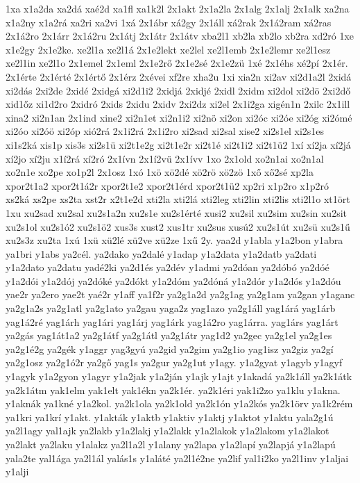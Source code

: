 {1xa
x1a2da
xa2dá
xaé2d
xa1fl
xa1k2l
2x1akt
2x1a2la
2x1alg
2x1alj
2x1alk
xa2na
x1a2ny
x1a2rá
xa2ri
xa2vi
1xá
2x1ábr
xá2gy
2x1áll
xá2rak
2x1á2ram
xá2ras
2x1á2ro
2x1árr
2x1á2ru
2x1átj
2x1átr
2x1átv
xba2l1
xb2la
xb2lo
xb2ra
xd2ró
1xe
x1e2gy
2x1e2ke.
xe2l1a
xe2l1á
2x1e2lekt
xe2lel
xe2l1emb
2x1e2lemr
xe2l1esz
xe2l1in
xe2l1o
2x1emel
2x1eml
2x1e2rő
2x1e2sé
2x1e2zü
1xé
2x1éhs
xé2pí
2x1ér.
2x1érte
2x1érté
2x1értő
2x1érz
2xévei
xf2re
xha2u
1xi
xia2n
xi2av
xi2d1a2l
2xidá
xi2dás
2xi2de
2xidé
2xidgá
xi2d1i2
2xidjá
2xidjé
2xidl
2xidm
xi2dol
xi2dö
2xi2dő
xid1őz
xi1d2ro
2xidró
2xids
2xidu
2xidv
2xi2dz
xi2el
2x1i2ga
xigén1n
2xilc
2x1ill
xina2
xi2n1an
2x1ind
xine2
xi2n1et
xi2n1i2
xi2nö
xi2on
xi2óc
xi2óe
xi2óg
xi2ómé
xi2óo
xi2óö
xi2óp
xió2rá
2x1i2rá
2x1i2ro
xi2sad
xi2sal
xise2
xi2s1el
xi2s1es
xi1s2ká
xis1p
xis3s
xi2s1ü
xi2t1e2g
xi2t1e2r
xi2t1é
xi2t1i2
xi2t1ü2
1xí
xí2ja
xí2já
xí2jo
xí2ju
x1í2rá
xí2ró
2x1ívn
2x1í2vü
2x1ívv
1xo
2x1old
xo2n1ai
xo2n1al
xo2n1e
xo2pe
xo1p2l
2x1osz
1xó
1xö
xö2dé
xö2rö
xö2zö
1xő
xő2sé
xp2la
xpor2t1a2
xpor2t1á2r
xpor2t1e2
xpor2t1érd
xpor2t1ü2
xp2ri
x1p2ro
x1p2ró
xs2ká
xs2pe
xs2ta
xst2r
x2t1e2d
xti2la
xti2lá
xti2leg
xti2lin
xti2lis
xti2l1o
xt1ört
1xu
xu2sad
xu2sal
xu2s1a2n
xu2s1e
xu2s1érté
xusi2
xu2sil
xu2sim
xu2sin
xu2sit
xu2s1ol
xu2s1ó2
xu2s1ö2
xus3s
xust2
xus1tr
xu2sus
xusú2
xu2s1út
xu2sü
xu2s1ű
xu2s3z
xu2ta
1xú
1xü
xü2lé
xü2ve
xü2ze
1xű
2y.
yaa2d
y1abla
y1a2bon
y1abra
ya1bri
y1abs
ya2cél.
ya2dako
ya2dalé
y1adap
y1a2data
y1a2datb
ya2dati
y1a2dato
ya2datu
yadé2ki
ya2d1és
ya2dév
y1admi
ya2dóan
ya2dóbó
ya2dóé
y1a2dói
y1a2dój
ya2dóké
ya2dókt
y1a2dóm
ya2dóná
y1a2dór
y1a2dós
y1a2dóu
yae2r
ya2ero
yae2t
yaé2r
y1aff
ya1f2r
ya2g1a2d
ya2g1ag
ya2g1am
ya2gan
y1aganc
ya2g1a2s
ya2g1atl
ya2g1ato
ya2gau
yaga2z
yag1azo
ya2g1áll
yag1árá
yag1árb
yag1á2ré
yag1árh
yag1ári
yag1árj
yag1árk
yag1á2ro
yag1árra.
yag1árs
yag1árt
ya2gás
yag1át1a2
ya2g1átf
ya2g1átl
ya2g1átr
yag1d2
ya2gec
ya2g1el
ya2g1es
ya2g1é2g
ya2gék
y1aggr
yag3gyú
ya2gid
ya2gim
ya2g1io
yag1isz
ya2giz
ya2gí
ya2g1osz
ya2g1ó2r
ya2gő
yag1s
ya2gur
ya2g1ut
y1agy.
y1a2gyat
y1agyb
y1agyf
y1agyk
y1a2gyon
y1agyr
y1a2jak
y1a2ján
y1ajk
y1ajt
y1akadá
ya2k1áll
ya2k1átk
ya2k1átm
yak1elm
yak1elt
yak1ékn
ya2k1ér.
ya2k1éri
yak1i2zo
ya1klu
y1akna.
y1aknák
ya1kné
y1a2kol.
ya2k1ola
ya2k1old
ya2k1ón
y1a2kós
ya2k1örv
ya1k2rém
ya1kri
ya1krí
y1akt.
y1akták
y1aktb
y1aktiv
y1aktj
y1aktot
y1aktu
yala2g1ú
ya2l1agy
yal1ajk
ya2lakb
y1a2lakj
y1a2lakk
y1a2lakok
y1a2lakom
y1a2lakot
ya2lakt
ya2laku
y1alakz
ya2l1a2l
y1alany
ya2lapa
y1a2lapí
ya2lapjá
y1a2lapú
yala2te
yal1ága
ya2l1ál
yalás1s
y1aláté
ya2l1é2ne
ya2lif
yal1i2ko
ya2l1inv
y1aljai
y1alji
}
